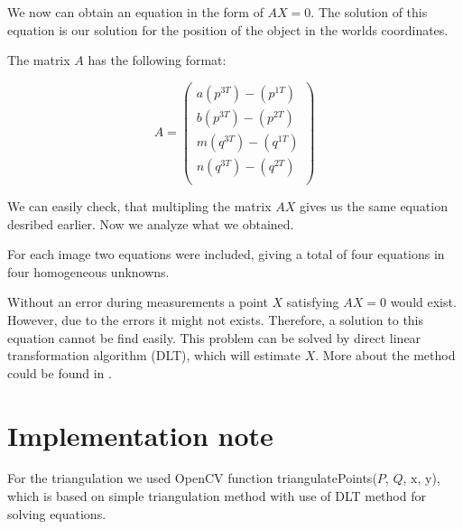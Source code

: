 We now can obtain an equation in the form of $AX = 0$. The solution of this
equation is our solution for the position of the object in the worlds
coordinates.

The matrix $A$ has the following format:

\[
A = \begin{pmatrix}
a(p^{3T}) - (p^{1T}) \\
b(p^{3T}) - (p^{2T}) \\
m(q^{3T}) - (q^{1T}) \\
n(q^{3T}) - (q^{2T}) \\
\end{pmatrix}
\]

We can easily check, that multipling the matrix $AX$ gives us the same equation
desribed earlier. Now we analyze what we obtained.

For each image two equations were included, giving a total of four equations in
four homogeneous unknowns.

Without an error during measurements a point $X$ satisfying $AX = 0$ would
exist. However, due to the errors it might not exists. Therefore, a solution to
this equation cannot be find easily. This problem can be solved by direct
linear transformation algorithm (DLT), which will estimate $X$. More about the
method could be found in \citet*{multiple-view-geometry}.

\section*{Implementation note}
For the triangulation we used OpenCV function triangulatePoints($P$, $Q$,
$\mathrm{x}$, $\mathrm{y}$), which is based on simple triangulation method with use of DLT
method for solving equations.
